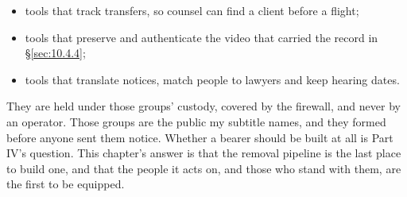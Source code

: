 \begin{itemize}
\item tools that track transfers, so counsel can find a client before a flight;
\item tools that preserve and authenticate the video that carried the record in \S\ref{sec:10.4.4};
\item tools that translate notices, match people to lawyers and keep hearing dates.
\end{itemize}

They are held under those groups' custody, covered by the firewall, and never by an operator. Those groups are the public my subtitle names, and they formed before anyone sent them notice. Whether a bearer should be built at all is Part IV's question. This chapter's answer is that the removal pipeline is the last place to build one, and that the people it acts on, and those who stand with them, are the first to be equipped.
